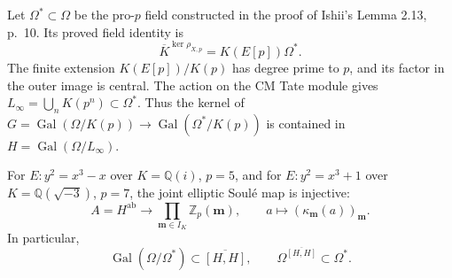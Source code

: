 Let \(\Omega^*\subset\Omega\) be the pro-\(p\) field constructed
in the proof of Ishii's Lemma 2.13, p.~10. Its proved field
identity is
\[
 \overline K^{\ker\rho_{X,p}}=K(E[p])\Omega^* .
\]
The finite extension \(K(E[p])/K(p)\) has degree prime to \(p\),
and its factor in the outer image is central. The action on
the CM Tate module gives \(L_\infty=\bigcup_nK(p^n)\subset\Omega^*\).
Thus the kernel of \(G=\operatorname{Gal}(\Omega/K(p))
\to\operatorname{Gal}(\Omega^*/K(p))\) is contained in
\(H=\operatorname{Gal}(\Omega/L_\infty)\).

\begin{proposition}\label{prop:cm-abelian-detection}
For \(E:y^2=x^3-x\) over \(K=\mathbb Q(i)\), \(p=5\), and
for \(E:y^2=x^3+1\) over \(K=\mathbb Q(\sqrt{-3})\), \(p=7\),
the joint elliptic Soul\'e map is injective:
\[
 A=H^{\mathrm{ab}}
   \longrightarrow\prod_{\boldsymbol m\in I_K}
                 \mathbb Z_p(\boldsymbol m),
 \qquad a\longmapsto(\kappa_{\boldsymbol m}(a))_{\boldsymbol m}.
\]
In particular,
\[
 \operatorname{Gal}(\Omega/\Omega^*)\subset
       \overline{[H,H]},
 \qquad
 \Omega^{\overline{[H,H]}}\subset\Omega^* .
\]
\end{proposition}
